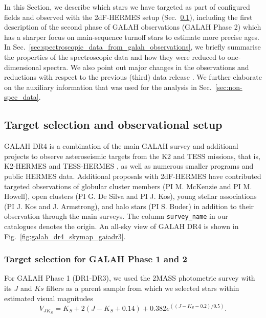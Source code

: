 \documentclass[
  journal=pasa,
  manuscript=research-paper, %
  year=2024,
  volume=37
]{cup-journal}
\begin{document}
In this Section, we describe which stars we have targeted as part of configured fields \citep{Miszalski2006} and observed with the 2dF-HERMES setup (Sec.~\ref{sec:target_selection_observations}), including the first description of the second phase of GALAH observations (GALAH Phase 2) which has a sharper focus on main-sequence turnoff stars to estimate more precise ages. In Sec.~\ref{sec:spectroscopic_data_from_galah_observations}, we briefly summarise the properties of the spectroscopic data and how they were reduced to one-dimensional spectra. We also point out major changes in the observations and reductions with respect to the previous (third) data release \citep{Buder2021}. We further elaborate on the auxiliary information that was used for the analysis in Sec.~\ref{sec:non-spec_data}.

\subsection{Target selection and observational setup} \label{sec:target_selection_observations}

GALAH DR4 is a combination of the main GALAH survey and additional projects to observe asteroseismic targets from the K2 \citep{Howell2014} and TESS \citep{Ricker2015} missions, that is, K2-HERMES \citep{Sharma2019} and TESS-HERMES \citep{Sharma2018}, as well as numerous smaller programs and public HERMES data. Additional proposals with 2dF-HERMES have contributed targeted observations of globular cluster members (PI M. McKenzie and PI M. Howell), open clusters (PI G. De Silva and PI J. Kos), young stellar associations (PI J. Kos and J. Armstrong), and halo stars (PI S. Buder) in addition to their observation through the main surveys. The column \texttt{survey\_name} in our catalogues denotes the origin. An all-sky view of GALAH DR4 is shown in Fig.~\ref{fig:galah_dr4_skymap_gaiadr3}.

\subsubsection{Target selection for GALAH Phase 1 and 2}

For GALAH Phase 1 (DR1-DR3), we used the 2MASS photometric survey \citep{Skrutskie2006} with its $J$ and $Ks$ filters as a parent sample from which we selected stars within estimated visual magnitudes
\begin{equation}
V_{JK_S} = K_S+2(J-K_S+0.14)+0.382e^{((J-K_S-0.2)/0.5)}.
\end{equation}
\end{document}
